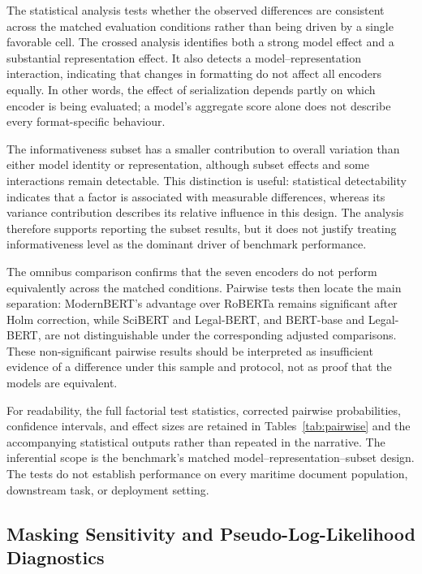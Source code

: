The statistical analysis tests whether the observed differences are consistent across the matched evaluation conditions rather than being driven by a single favorable cell. The crossed analysis identifies both a strong model effect and a substantial representation effect. It also detects a model--representation interaction, indicating that changes in formatting do not affect all encoders equally. In other words, the effect of serialization depends partly on which encoder is being evaluated; a model's aggregate score alone does not describe every format-specific behaviour.

The informativeness subset has a smaller contribution to overall variation than either model identity or representation, although subset effects and some interactions remain detectable. This distinction is useful: statistical detectability indicates that a factor is associated with measurable differences, whereas its variance contribution describes its relative influence in this design. The analysis therefore supports reporting the subset results, but it does not justify treating informativeness level as the dominant driver of benchmark performance.

The omnibus comparison confirms that the seven encoders do not perform equivalently across the matched conditions. Pairwise tests then locate the main separation: ModernBERT's advantage over RoBERTa remains significant after Holm correction, while SciBERT and Legal-BERT, and BERT-base and Legal-BERT, are not distinguishable under the corresponding adjusted comparisons. These non-significant pairwise results should be interpreted as insufficient evidence of a difference under this sample and protocol, not as proof that the models are equivalent.

For readability, the full factorial test statistics, corrected pairwise probabilities, confidence intervals, and effect sizes are retained in Tables~\ref{tab:pairwise} and the accompanying statistical outputs rather than repeated in the narrative. The inferential scope is the benchmark's matched model--representation--subset design. The tests do not establish performance on every maritime document population, downstream task, or deployment setting.



\subsection{Masking Sensitivity and Pseudo-Log-Likelihood Diagnostics}
\label{sec:masking}


